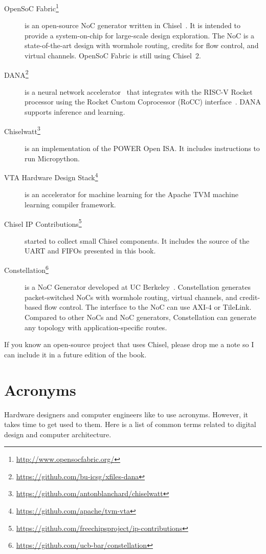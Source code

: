 \documentclass[%
    10pt,
    headinclude, footexclude,
    openright, %
    notitlepage,
    cleardoubleempty,
    headsepline,
    pointlessnumbers,
    bibtotoc, idxtotoc,
    ]{scrbook}
\newcommand{\myref}[2]{\href{#1}{#2}}
\renewcommand{\myref}[2]{{#2}{\footnote{\url{#1}}}}
\begin{document}
\begin{description}
\item[\myref{http://www.opensocfabric.org/}{OpenSoC Fabric}] is an open-source NoC
generator written in Chisel~\cite{OpenSoC:ispass2016}. It is intended to provide a
system-on-chip for large-scale design exploration.
The NoC is a state-of-the-art design with wormhole routing, credits for flow control, and virtual channels.
OpenSoC Fabric is still using Chisel~2.

\item[\myref{https://github.com/bu-icsg/xfiles-dana}{DANA}] is a neural network accelerator~\cite{eldridge2015}
that integrates with the RISC-V Rocket processor using the Rocket Custom Coprocessor (RoCC) interface~\cite{RoCC:2015}.
DANA supports inference and learning.

\item[\myref{https://github.com/antonblanchard/chiselwatt}{Chiselwatt}] is an implementation
of the POWER Open ISA. It includes instructions to run Micropython.

\item[\myref{https://github.com/apache/tvm-vta}{VTA Hardware Design Stack}] is an accelerator for
machine learning for the Apache TVM machine learning compiler framework.

\item[\myref{https://github.com/freechipsproject/ip-contributions}{Chisel IP Contributions}]
started to collect small Chisel components. It includes the source of the
UART and FIFOs presented in this book.

\item[\myref{https://github.com/ucb-bar/constellation}{Constellation}] is a NoC Generator
developed at UC Berkeley~\cite{Constellation:2022}.
Constellation generates packet-switched NoCs with wormhole routing,
virtual channels, and credit-based flow control. The interface to the NoC
can use AXI-4 or TileLink. Compared to other NoCs and NoC generators,
Constellation can generate any topology with application-specific routes.

\end{description}

If you know an open-source project that uses Chisel, please drop me a note
so I can include it in a future edition of the book.


\chapter{Acronyms}

Hardware designers and computer engineers like to use acronyms.
However, it takes time to get used to them. Here is a list of common terms
related to digital design and computer architecture.
\end{document}
